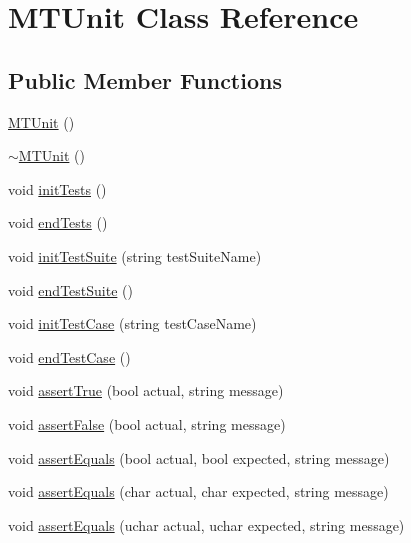\hypertarget{class_m_t_unit}{}\section{M\+T\+Unit Class Reference}
\label{class_m_t_unit}
\subsection*{Public Member Functions}
\begin{DoxyCompactItemize}
\item 
\mbox{\hyperlink{class_m_t_unit_a1256e3e0b1c57479036f10a817c887e2}{M\+T\+Unit}} ()
\item 
\mbox{\hyperlink{class_m_t_unit_a36199d28fffea660a4f0b481907f225f}{$\sim$\+M\+T\+Unit}} ()
\item 
void \mbox{\hyperlink{class_m_t_unit_ac5ad32a3325f61ce9accab32d56ca1d4}{init\+Tests}} ()
\item 
void \mbox{\hyperlink{class_m_t_unit_a9d26984442ca8c3a13c3d6aaa581691a}{end\+Tests}} ()
\item 
void \mbox{\hyperlink{class_m_t_unit_a29ea187d53e25eb84ea688312e3d737e}{init\+Test\+Suite}} (string test\+Suite\+Name)
\item 
void \mbox{\hyperlink{class_m_t_unit_a77ec52865ae9285c4ad1ba532da7b047}{end\+Test\+Suite}} ()
\item 
void \mbox{\hyperlink{class_m_t_unit_a1e7cb46dba78294140e278e9ef61de1e}{init\+Test\+Case}} (string test\+Case\+Name)
\item 
void \mbox{\hyperlink{class_m_t_unit_a6717e2370b1bf84b72be622dda8fd624}{end\+Test\+Case}} ()
\item 
void \mbox{\hyperlink{class_m_t_unit_aa8c5564965a26d8e26a426595d3d2a13}{assert\+True}} (bool actual, string message)
\item 
void \mbox{\hyperlink{class_m_t_unit_a625a8575cf6eece310d1b4c1f252dff8}{assert\+False}} (bool actual, string message)
\item 
void \mbox{\hyperlink{class_m_t_unit_a46a6d6e4c695d4acc94a17e39c3a2f4e}{assert\+Equals}} (bool actual, bool expected, string message)
\item 
void \mbox{\hyperlink{class_m_t_unit_ad8b22a51b60e31da794e4a7f068b2d18}{assert\+Equals}} (char actual, char expected, string message)
\item 
void \mbox{\hyperlink{class_m_t_unit_a4f900d0dc6bb257fd79985769d97878c}{assert\+Equals}} (uchar actual, uchar expected, string message)
\item 

\end{DoxyCompactItemize}
